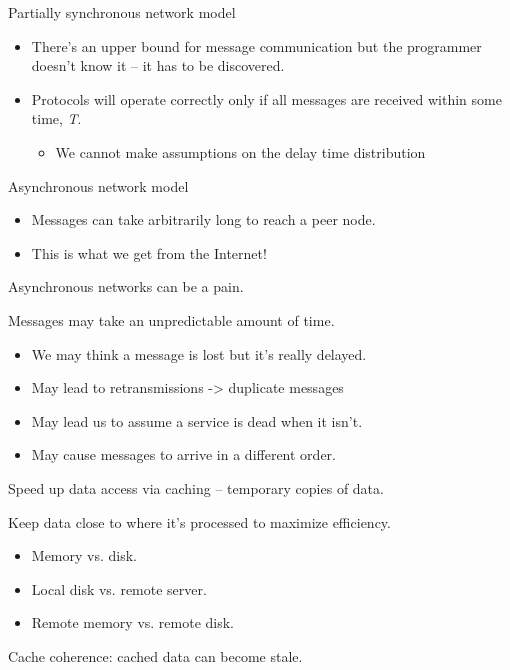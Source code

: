 \begin{slide}

	
	Partially synchronous network model
	\begin{itemize}
		\item There’s an upper bound for message communication but the programmer doesn’t know it – it has to be discovered.
		\item Protocols will operate correctly only if all messages are received within some time, \textit{T}.
		\begin{itemize}
			\item We cannot make assumptions on the delay time distribution
		\end{itemize}
	\end{itemize}
	
\end{slide}

\begin{slide}

	
	Asynchronous network model
	\begin{itemize}
		\item Messages can take arbitrarily long to reach a peer node.
		\item This is what we get from the Internet!
	\end{itemize}
	\bigskip
	
	Asynchronous networks can be a pain.
	\bigskip
	
	Messages may take an unpredictable amount of time.
	\begin{itemize}
		\item We may think a message is lost but it’s really delayed.
		\item May lead to retransmissions -> duplicate messages
		\item May lead us to assume a service is dead when it isn’t.
		\item May cause messages to arrive in a different order.
	\end{itemize}
	
\end{slide}

\begin{slide}

	
	Speed up data access via caching – temporary copies of data.
	\bigskip
	
	Keep data close to where it’s processed to maximize efficiency.
	\begin{itemize}
		\item Memory vs. disk.
		\item Local disk vs. remote server.
		\item Remote memory vs. remote disk.
	\end{itemize}
	\bigskip
	
	Cache coherence: cached data can become stale.

\end{slide}

